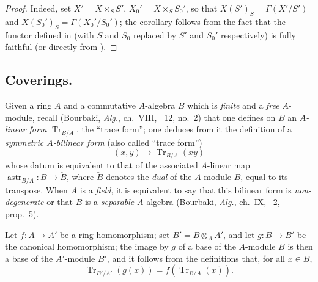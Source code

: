 \begin{proof}
Indeed, set $X'=X\times_S S'$, $X_0'=X\times_S S_0'$, so that $X(S')_S=\Gamma(X'/S')$ and $X(S_0')_S=\Gamma(X_0'/S_0')$;
the corollary follows from the fact that the functor defined in  (with $S$ and $S_0$ replaced by $S'$ and $S_0'$ respectively) is fully faithful (or directly from ).
\end{proof}

\subsection{Coverings.}
\label{subsection:IV.18.2}

\begin{env}[18.2.1]
\label{IV.18.2.1}
Given a ring $A$ and a commutative $A$-algebra $B$ which is \emph{finite} and a \emph{free} $A$-module, recall (Bourbaki, \emph{Alg.}, ch.~VIII, \textsection~12, no.~2) that one defines on $B$ an \emph{$A$-linear form} $\operatorname{Tr}_{B/A}$, the ``trace form'';
one deduces from it the definition of a \emph{symmetric $A$-bilinear form} (also called ``trace form'')
\[
\label{IV.18.2.1.1}
(x,y)\mapsto\operatorname{Tr}_{B/A}(xy)
\tag{18.2.1.1}
\]
whose datum is equivalent to that of the associated $A$-linear map $\operatorname{astr}_{B/A}:B\to\check{B}$, where $\check{B}$ denotes the \emph{dual} of the $A$-module $B$, equal to its transpose.
When $A$ is a \emph{field}, it is equivalent to say that this bilinear form is \emph{non-degenerate} or that $B$ is a \emph{separable} $A$-algebra (Bourbaki, \emph{Alg.}, ch.~IX, \textsection~2, prop.~5).

Let $f:A\to A'$ be a ring homomorphism;
set $B'=B\otimes_A A'$, and let $g:B\to B'$ be the canonical homomorphism;
the image by $g$ of a base of the $A$-module $B$ is then a base of the $A'$-module $B'$, and it follows from the definitions that, for all $x\in B$,
\[
\label{IV.18.2.1.2}
\operatorname{Tr}_{B'/A'}(g(x))=f(\operatorname{Tr}_{B/A}(x)).
\tag{18.2.1.2}
\]
\end{env}

